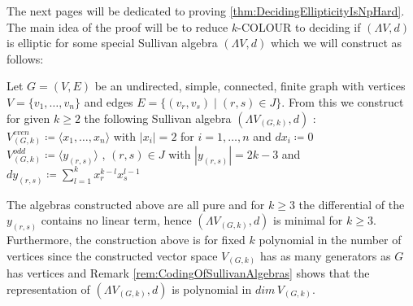  The next pages will be dedicated to proving \ref{thm:DecidingEllipticityIsNpHard}.
 The main idea of the proof will be to reduce $k$-COLOUR to deciding if $(\Lambda V,d)$ is elliptic for some special 
 Sullivan algebra $(\Lambda V,d)$ which we will construct as follows: \\
 
 \begin{Construction}
 \label{constructionOfSullivanAlgebra}
 Let $G = (V,E)$ be an undirected, simple, connected, finite graph with vertices $ V = \lbrace v_1, \dotsc , v_n \rbrace $
 and edges $ E = \lbrace (v_r, v_s) \; | \; (r,s) \in J \rbrace$. From this we construct for given $k \geq 2$ the following
 Sullivan algebra $(\Lambda V_{(G,k)} , d)$ : \\
 
 $ V^{even}_{(G,k)} \coloneqq \langle x_1, \dotsc , x_n \rangle $ \; with \; $|x_i| = 2$ \; for \; $ i = 1, \dotsc , n$ \; 
 and \; $dx_i \coloneqq 0$ \\
 
 $V^{odd}_{(G,k)} \coloneqq \langle y_{(r,s)} \rangle$ , $(r,s) \in J$ \; with \; $|y_{(r,s)}| = 2k - 3$ \; and \; $dy_{(r,s)} \coloneqq 
 \sum_{l = 1}^k x_r^{k -l} x_s^{l - 1}$ \\
 
 \end{Construction}

\begin{Remark}
  The algebras constructed above are all pure and
  for $k \geq 3$ the differential of the $y_{(r,s)}$ contains no linear term, hence
  $(\Lambda V_{(G,k)} ,d)$ is minimal for $k \geq 3$. Furthermore, the construction above
  is for fixed $k$ polynomial in the number of vertices since the constructed vector space
  $V_{(G,k)}$ has as many generators as $G$ has vertices and Remark \ref{rem:CodingOfSullivanAlgebras}
  shows that the representation of $(\Lambda V_{(G,k)} ,d)$ is polynomial in $dim \, V_{(G,k)}$.
  
\end{Remark}

